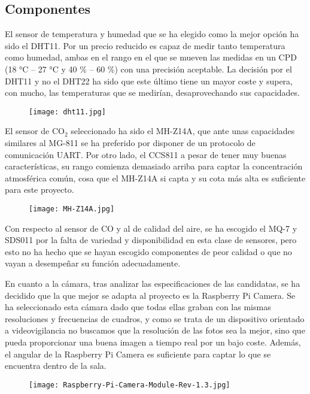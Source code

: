 \subsection{Componentes}\label{subsec:componentes}
El sensor de temperatura y humedad que se ha elegido como la mejor opción ha sido el DHT11. Por un precio reducido es capaz de medir tanto temperatura como humedad, ambas en el rango en el que se mueven las medidas en un CPD (18 °C -- 27 °C y  40 \% -- 60 \%) con una precisión aceptable. La decisión por el DHT11 y no el DHT22 ha sido que este último tiene un mayor coste y supera, con mucho, las temperaturas que se medirían, desaprovechando sus capacidades.
\begin{figure}[H]
	{\texttt{[image: dht11.jpg]}}\label{fig:dht11}
\end{figure}
El sensor de CO$_2$ seleccionado ha sido el MH-Z14A, que ante unas capacidades similares al MG-811 se ha preferido por disponer de un protocolo de comunicación UART. Por otro lado, el CCS811 a pesar de tener muy buenas características, su rango comienza demasiado arriba para captar la concentración atmosférica común, cosa que el MH-Z14A si capta y su cota más alta es suficiente para este proyecto.
\begin{figure}[H]
	{\texttt{[image: MH-Z14A.jpg]}}\label{fig:mh-z14a}
\end{figure}
Con respecto al sensor de CO y al de calidad del aire, se ha escogido el MQ-7 y SDS011 por la falta de variedad y disponibilidad en esta clase de sensores, pero esto no ha hecho que se hayan escogido componentes de peor calidad o que no vayan a desempeñar su función adecuadamente.

En cuanto a la cámara, tras analizar las especificaciones de las candidatas, se ha decidido que la que mejor se adapta al proyecto es la Raspberry Pi Camera. Se ha seleccionado esta cámara dado que todas ellas graban con las mismas resoluciones y frecuencias de cuadros, y como se trata de un dispositivo orientado a videovigilancia no buscamos que la resolución de las fotos sea la mejor, sino que pueda proporcionar una buena imagen a tiempo real por un bajo coste. Además, el angular de la Raspberry Pi Camera es suficiente para captar lo que se encuentra dentro de la sala.
\begin{figure}[H]
	{\texttt{[image: Raspberry-Pi-Camera-Module-Rev-1.3.jpg]}}\label{fig:moduloCamara}
\end{figure}
\pagebreak

